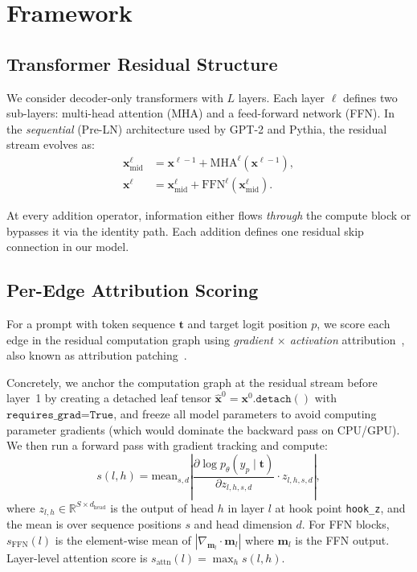 \documentclass{article}
\begin{document}
\section{Framework}

\subsection{Transformer Residual Structure}

We consider decoder-only transformers with $L$ layers.
Each layer $\ell$ defines two sub-layers: multi-head attention (MHA) and
a feed-forward network (FFN).
In the \emph{sequential} (Pre-LN) architecture used by GPT-2 and Pythia,
the residual stream evolves as:
\begin{align}
  \mathbf{x}^{\ell}_{\mathrm{mid}} &= \mathbf{x}^{\ell-1} +
    \mathrm{MHA}^\ell(\mathbf{x}^{\ell-1}), \\
  \mathbf{x}^{\ell} &= \mathbf{x}^{\ell}_{\mathrm{mid}} +
    \mathrm{FFN}^\ell(\mathbf{x}^{\ell}_{\mathrm{mid}}).
\end{align}

At every addition operator, information either flows \emph{through} the
compute block or bypasses it via the identity path.
Each addition defines one residual skip connection in our model.

\subsection{Per-Edge Attribution Scoring}

For a prompt with token sequence $\mathbf{t}$ and target logit position
$p$, we score each edge in the residual computation graph using
\emph{gradient $\times$ activation} attribution~\citep{baehrens2010how,
simonyan2013deep}, also known as attribution patching~\citep{nanda2023attribution}.

Concretely, we anchor the computation graph at the residual stream
before layer~1 by creating a detached leaf tensor
$\hat{\mathbf{x}}^0 = \mathbf{x}^0.\texttt{detach}()$
with $\texttt{requires\_grad=True}$, and freeze all model parameters to
avoid computing parameter gradients (which would dominate the backward
pass on CPU/GPU).
We then run a forward pass with gradient tracking and compute:
\begin{equation}
  s(l, h) = \mathrm{mean}_{s,d}
    \left| \frac{\partial \log p_\theta(y_p \mid \mathbf{t})}
                {\partial z_{l,h,s,d}} \cdot z_{l,h,s,d} \right|,
\end{equation}
where $z_{l,h} \in \mathbb{R}^{S \times d_{\mathrm{head}}}$ is the
output of head $h$ in layer $l$ at hook point \texttt{hook\_z},
and the mean is over sequence positions $s$ and head dimension $d$.
For FFN blocks, $s_{\mathrm{FFN}}(l)$ is the element-wise mean of
$|\nabla_{\mathbf{m}_l} \cdot \mathbf{m}_l|$ where $\mathbf{m}_l$ is
the FFN output.
Layer-level attention score is $s_{\mathrm{attn}}(l) = \max_h s(l,h)$.
\end{document}
